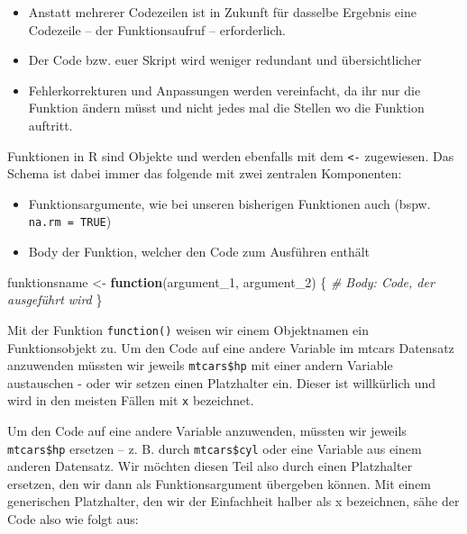 \documentclass[
]{article}
\newenvironment{Shaded}{\begin{snugshade}}{\end{snugshade}}
\newcommand{\CommentTok}[1]{\textcolor[rgb]{0.56,0.35,0.01}{\textit{#1}}}
\newcommand{\ControlFlowTok}[1]{\textcolor[rgb]{0.13,0.29,0.53}{\textbf{#1}}}
\newcommand{\NormalTok}[1]{#1}
\newcommand{\OtherTok}[1]{\textcolor[rgb]{0.56,0.35,0.01}{#1}}
\providecommand{\tightlist}{%
  \setlength{\itemsep}{0pt}\setlength{\parskip}{0pt}}
\begin{document}
\begin{itemize}
\tightlist
\item
  Anstatt mehrerer Codezeilen ist in Zukunft für dasselbe Ergebnis eine Codezeile -- der Funktionsaufruf -- erforderlich.
\item
  Der Code bzw. euer Skript wird weniger redundant und übersichtlicher
\item
  Fehlerkorrekturen und Anpassungen werden vereinfacht, da ihr nur die Funktion ändern müsst und nicht jedes mal die Stellen wo die Funktion auftritt.
\end{itemize}

Funktionen in R sind Objekte und werden ebenfalls mit dem \texttt{\textless{}-} zugewiesen. Das Schema ist dabei immer das folgende mit zwei zentralen Komponenten:

\begin{itemize}
\tightlist
\item
  Funktionsargumente, wie bei unseren bisherigen Funktionen auch (bspw. \texttt{na.rm\ =\ TRUE})
\item
  Body der Funktion, welcher den Code zum Ausführen enthält
\end{itemize}

\begin{Shaded}
\begin{Highlighting}[]
\NormalTok{funktionsname }\OtherTok{\textless{}{-}} \ControlFlowTok{function}\NormalTok{(argument\_1, argument\_2) \{}
  \CommentTok{\# Body: Code, der ausgeführt wird}
\NormalTok{\}}
\end{Highlighting}
\end{Shaded}

Mit der Funktion \texttt{function()} weisen wir einem Objektnamen ein Funktionsobjekt zu. Um den Code auf eine andere Variable im mtcars Datensatz anzuwenden müssten wir jeweils \texttt{mtcars\$hp} mit einer andern Variable austauschen - oder wir setzen einen Platzhalter ein. Dieser ist willkürlich und wird in den meisten Fällen mit \texttt{x} bezeichnet.

Um den Code auf eine andere Variable anzuwenden, müssten wir jeweils \texttt{mtcars\$hp} ersetzen -- z. B. durch \texttt{mtcars\$cyl} oder eine Variable aus einem anderen Datensatz. Wir möchten diesen Teil also durch einen Platzhalter ersetzen, den wir dann als Funktionsargument übergeben können. Mit einem generischen Platzhalter, den wir der Einfachheit halber als x bezeichnen, sähe der Code also wie folgt aus:
\end{document}
